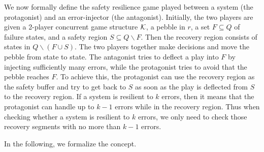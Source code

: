 We now formally define the safety resilience game played between a 
system (the protagonist) and an error-injector (the antagonist).  
Initially, the two players are given a 2-player concurrent game structure ${\cal K}$,  
a pebble in $r$,  
a set $F\subseteq Q$ of failure states, and 
a safety region $S\subseteq Q\smallsetminus F$. 
Then the recovery region consists of states in $Q\smallsetminus (F\cup S)$.  
The two players together make decisions and move the pebble from state to state.   
The antagonist tries to deflect a play into $F$ by injecting sufficiently many errors, while
the protagonist tries to avoid that the pebble reaches $F$. 
To achieve this, the protagonist can use the recovery region as the safety buffer and try to 
get back to $S$ as soon as the play is deflected from $S$ 
to the recovery region.  
If a system is resilient to $k$ errors, then it means that 
the protagonist can handle up to $k-1$ errors while in the recovery region.  
Thus when checking whether a system is resilient to $k$ errors, 
we only need to check those recovery segments with no more than $k-1$ errors. 

In the following, we formalize the concept.  


